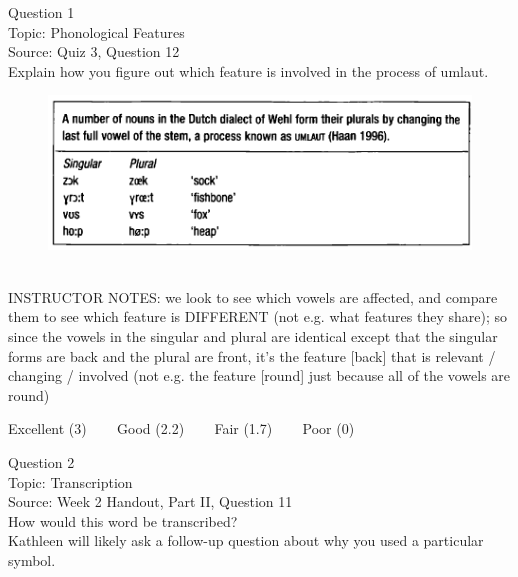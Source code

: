 \documentclass[12pt]{article}
\begin{document}
\begin{center}
\textbf{{\color{blue}{\HUGE START OF EXAM\\}}}

\textbf{{\color{blue}{\HUGE Student ID: 92054\\}}}

\textbf{{\color{blue}{\HUGE 4:10\\}}}

\end{center}
\newpage

{\large Question 1}\\

Topic: Phonological Features\\
Source: Quiz 3, Question 12\\

Explain how you figure out which feature is involved in the process of umlaut.\\

\begin{figure}[H]
\includegraphics{../images/dutch.png}
\end{figure}

~\\
INSTRUCTOR NOTES: we look to see which vowels are affected, and compare them to see which feature is DIFFERENT (not e.g. what features they share); so since the vowels in the singular and plural are identical except that the singular forms are back and the plural are front, it's the feature [back] that is relevant / changing / involved (not e.g. the feature [round] just because all of the vowels are round)


\vfill
Excellent (3) ~~~ Good (2.2) ~~~ Fair (1.7) ~~~ Poor (0)
\newpage

{\large Question 2}\\

Topic: Transcription\\
Source: Week 2 Handout, Part II, Question 11\\

How would this word be transcribed?\\ Kathleen will likely ask a follow-up question about why you used a particular symbol.\\
\end{document}
